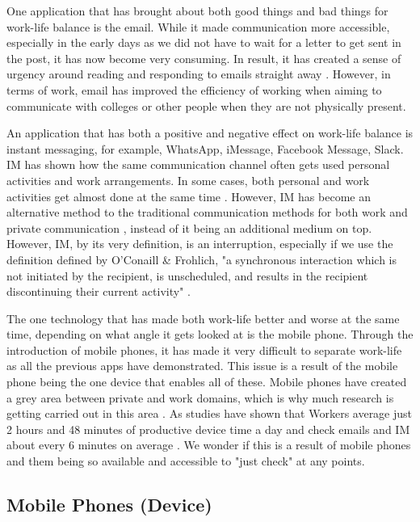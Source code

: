 \documentclass{sigchi}
\begin{document}
	One application that has brought about both good things and bad things for work-life balance is the email. While it made communication more accessible, especially in the early days as we did not have to wait for a letter to get sent in the post, it has now become very consuming. In result, it has created a sense of urgency around reading and responding to emails straight away \cite{stawarz2013d}. However, in terms of work, email has improved the efficiency of working when aiming to communicate with colleges or other people when they are not physically present.
	
	An application that has both a positive and negative effect on work-life balance is instant messaging, for example, WhatsApp, iMessage, Facebook Message, Slack. IM has shown how the same communication channel often gets used personal activities and work arrangements. In some cases, both personal and work activities get almost done at the same time \cite{lindley2012s}. However, IM has become an alternative method to the traditional communication methods for both work \cite{siggroup2005group} and private communication \cite{flanagin2005online}, instead of it being an additional medium on top. However, IM, by its very definition, is an interruption, especially if we use the definition defined by O'Conaill \& Frohlich, "a synchronous interaction which is not initiated by the recipient, is unscheduled, and results in the recipient discontinuing their current activity" \cite{rennecker2003theorizing}. 
	
	
	
	The one technology that has made both work-life better and worse at the same time, depending on what angle it gets looked at is the mobile phone. Through the introduction of mobile phones, it has made it very difficult to separate work-life \cite{gronvall2016hci, sadler2006balancing} as all the previous apps have demonstrated. This issue is a result of the mobile phone being the one device that enables all of these. Mobile phones have created a grey area between private and work domains, which is why much research is getting carried out in this area \cite{fleck2015balancing}. As studies have shown that Workers average just 2 hours and 48 minutes of productive device time a day and check emails and IM about every 6 minutes on average \cite{rescuetime_study}. We wonder if this is a result of mobile phones and them being so available and accessible to "just check" at any points.
	
		\subsection{Mobile Phones (Device)}
		
\end{document}

